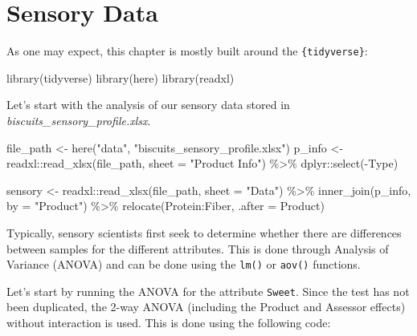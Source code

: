 \documentclass[
]{krantz}
\makeatletter
\newenvironment{Shaded}{\begin{snugshade}}{\end{snugshade}}
\newcommand{\AttributeTok}[1]{\textcolor[rgb]{0.61,0.61,0.61}{#1}}
\newcommand{\FunctionTok}[1]{\textcolor[rgb]{0,0,0}{#1}}
\newcommand{\NormalTok}[1]{#1}
\newcommand{\OtherTok}[1]{\textcolor[rgb]{0.37,0.37,0.37}{#1}}
\newcommand{\SpecialCharTok}[1]{\textcolor[rgb]{0,0,0}{#1}}
\newcommand{\StringTok}[1]{\textcolor[rgb]{0.5,0.5,0.5}{#1}}
\newenvironment{kframe}{%
\medskip{}
\setlength{\fboxsep}{.8em}
 \def\at@end@of@kframe{}%
 \ifinner\ifhmode%
  \def\at@end@of@kframe{\end{minipage}}%
  \begin{minipage}{\columnwidth}%
 \fi\fi%
 \def\FrameCommand##1{\hskip\@totalleftmargin \hskip-\fboxsep
 \colorbox{shadecolor}{##1}\hskip-\fboxsep
     \hskip-\linewidth \hskip-\@totalleftmargin \hskip\columnwidth}%
 \MakeFramed {\advance\hsize-\width
   \@totalleftmargin\z@ \linewidth\hsize
   \@setminipage}}%
 {\par\unskip\endMakeFramed%
 \at@end@of@kframe}
\renewenvironment{Shaded}{\begin{kframe}}{\end{kframe}}
\makeatother
\begin{document}
\hypertarget{sensory-analysis}{%
\section{Sensory Data}\label{sensory-analysis}}

As one may expect, this chapter is mostly built around the \texttt{\{tidyverse\}}:

\begin{Shaded}
\begin{Highlighting}[]
\FunctionTok{library}\NormalTok{(tidyverse)}
\FunctionTok{library}\NormalTok{(here)}
\FunctionTok{library}\NormalTok{(readxl)}
\end{Highlighting}
\end{Shaded}

Let's start with the analysis of our sensory data stored in \emph{biscuits\_sensory\_profile.xlsx}.

\begin{Shaded}
\begin{Highlighting}[]
\NormalTok{file\_path }\OtherTok{\textless{}{-}} \FunctionTok{here}\NormalTok{(}\StringTok{"data"}\NormalTok{, }\StringTok{"biscuits\_sensory\_profile.xlsx"}\NormalTok{)}
\NormalTok{p\_info }\OtherTok{\textless{}{-}}\NormalTok{ readxl}\SpecialCharTok{::}\FunctionTok{read\_xlsx}\NormalTok{(file\_path, }\AttributeTok{sheet =} \StringTok{"Product Info"}\NormalTok{) }\SpecialCharTok{\%\textgreater{}\%}
\NormalTok{  dplyr}\SpecialCharTok{::}\FunctionTok{select}\NormalTok{(}\SpecialCharTok{{-}}\NormalTok{Type)}

\NormalTok{sensory }\OtherTok{\textless{}{-}}\NormalTok{ readxl}\SpecialCharTok{::}\FunctionTok{read\_xlsx}\NormalTok{(file\_path, }\AttributeTok{sheet =} \StringTok{"Data"}\NormalTok{) }\SpecialCharTok{\%\textgreater{}\%}
  \FunctionTok{inner\_join}\NormalTok{(p\_info, }\AttributeTok{by =} \StringTok{"Product"}\NormalTok{) }\SpecialCharTok{\%\textgreater{}\%}
  \FunctionTok{relocate}\NormalTok{(Protein}\SpecialCharTok{:}\NormalTok{Fiber, }\AttributeTok{.after =}\NormalTok{ Product)}
\end{Highlighting}
\end{Shaded}

Typically, sensory scientists first seek to determine whether there are differences between samples for the different attributes. This is done through Analysis of Variance (ANOVA) and can be done using the \texttt{lm()} or \texttt{aov()} functions.

Let's start by running the ANOVA for the attribute \texttt{Sweet}. Since the test has not been duplicated, the 2-way ANOVA (including the Product and Assessor effects) without interaction is used. This is done using the following code:
\end{document}
